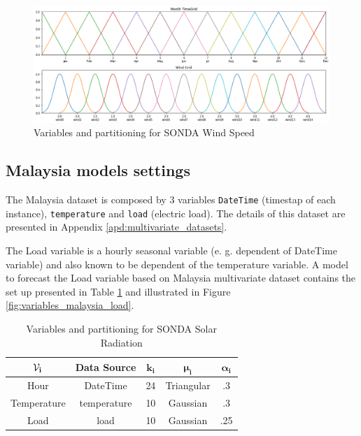 \begin{figure}[htb]
    \centering
    \includegraphics[width=\textwidth]{figures/variables_sonda_wind.png}
    \caption{Variables and partitioning for SONDA Wind Speed}
    \label{fig:variables_sonda_wind}
\end{figure}

\subsection{Malaysia models settings}
\label{sec:variables_malaysia}

The Malaysia dataset is composed by 3 variables \texttt{DateTime} (timestap of each instance), \texttt{temperature} and \texttt{load} (electric load). The details of this dataset are presented in Appendix \ref{apd:multivariate_datasets}.

The Load variable is a hourly seasonal variable (e. g. dependent of DateTime variable) and also known to be dependent of the temperature variable. A model to forecast the Load variable based on Malaysia multivariate dataset contains the set up presented in Table \ref{tab:variables_malaysia_load} and illustrated in Figure \ref{fig:variables_malaysia_load}. 

\begin{table}[htb]
    \centering
    \begin{tabular}{|c|c|c|c|c|} \hline
        $\mathbf{\mathcal{V}_i}$ & \textbf{Data Source} & $\mathbf{k_i}$ & $\mathbf{\mu_i}$ & $\mathbf{\alpha_i}$  \\ \hline
        Hour & DateTime & 24 & Triangular & .3 \\ \hline 
        Temperature & temperature & 10 & Gaussian & .3 \\ \hline 
        Load & load & 10 & Gaussian & .25 \\ \hline 
    \end{tabular}
    \caption{Variables and partitioning for SONDA Solar Radiation}
    \label{tab:variables_malaysia_load}
\end{table}

